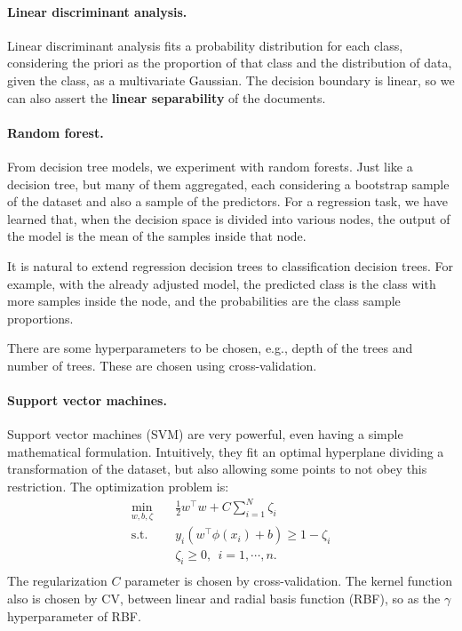     \paragraph{Linear discriminant analysis.} Linear discriminant analysis fits a probability distribution for each class, considering the priori as the proportion of that class and the distribution of data, given the class, as a multivariate Gaussian. The decision boundary is linear, so we can also assert the \textbf{linear separability} of the documents.

    \paragraph{Random forest.} From decision tree models, we experiment with random forests. Just like a decision tree, but many of them aggregated, each considering a bootstrap sample of the dataset and also a sample of the predictors. For a regression task, we have learned that, when the decision space is divided into various nodes, the output of the model is the mean of the samples inside that node.

    It is natural to extend regression decision trees to classification decision trees. For example, with the already adjusted model, the predicted class is the class with more samples inside the node, and the probabilities are the class sample proportions.

    There are some hyperparameters to be chosen, e.g., depth of the trees and number of trees. These are chosen using cross-validation.

    \paragraph{Support vector machines.} Support vector machines (SVM) are very powerful, even having a simple mathematical formulation. Intuitively, they fit an optimal hyperplane dividing a transformation of the dataset, but also allowing some points to not obey this restriction. The optimization problem is:
    \[\begin{aligned}
        \min_{w, b, \zeta} \quad & \frac{1}{2}w^\intercal w + C \sum_{i = 1}^{N}{\zeta_i} \\
        \textrm{s.t.} \quad & y_i (w^\intercal \phi(x_i) + b) \ge 1 - \zeta_i \\
        & \zeta_i \ge 0, \ \ i = 1, \cdots, n. \\
    \end{aligned}\]
    The regularization $C$ parameter is chosen by cross-validation. The kernel function also is chosen by CV, between linear and radial basis function (RBF), so as the $\gamma$ hyperparameter of RBF.
